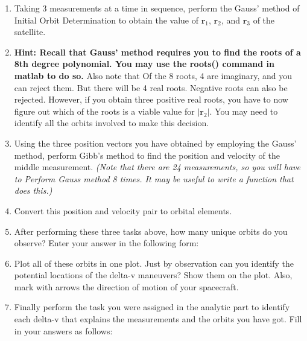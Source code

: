 \documentclass[12pt, letterpaper]{aiaa-tc}
\begin{document}
\begin{enumerate}
    \item Taking 3 measurements at a time in sequence, perform the Gauss' method of Initial Orbit Determination to
    obtain the value of $\bm{r}_1$, $\bm{r}_2$, and $\bm{r}_3$ of the satellite.
    \item \textbf{Hint: Recall that Gauss' method requires you to find the roots of a 8th degree polynomial. You may
    use the roots() command in matlab to do so.} Also note that Of the 8 roots, 4 are imaginary, and you can
    reject them. But there will be 4 real roots. Negative roots can also be rejected. However, if you obtain three
    positive real roots, you have to now figure out which of the roots is a viable value for $|\bm{r}_2|$. You may need to
    identify all the orbits involved to make this decision.
    \item Using the three position vectors you have obtained by employing the Gauss' method, perform Gibb's method
    to find the position and velocity of the middle measurement. \textit{(Note that there are 24 measurements, so you
    will have to Perform Gauss method 8 times. It may be useful to write a function that does this.)}
    \item Convert this position and velocity pair to orbital elements.
    \item After performing these three tasks above, how many unique orbits do you observe? Enter your answer in the
    following form:
    \item Plot all of these orbits in one plot. Just by observation can you identify the potential locations of the delta-v
    maneuvers? Show them on the plot. Also, mark with arrows the direction of motion of your spacecraft.
    \item Finally perform the task you were assigned in the analytic part to identify each delta-v that explains the
    measurements and the orbits you have got. Fill in your answers as follows:
\end{enumerate}
\end{document}
